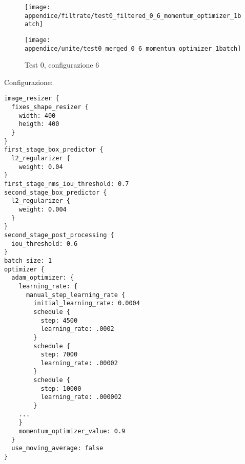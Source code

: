\newpage
\begin{figure}[H]  
    \begin{minipage}{.5\columnwidth}  
        \centering  
        \texttt{[image: appendice/filtrate/test0\_filtered\_0\_6\_momentum\_optimizer\_1batch]}  
    \end{minipage}%
    \begin{minipage}{0.5\columnwidth}  
        \centering  
        \texttt{[image: appendice/unite/test0\_merged\_0\_6\_momentum\_optimizer\_1batch]}  
    \end{minipage}  
    \caption{Test 0, configurazione 6}
\end{figure}%
Configurazione:
\begin{multicols}{2}
    \begin{lstlisting}
image_resizer {
  fixes_shape_resizer {
    width: 400
    heigth: 400
  }
}
first_stage_box_predictor {
  l2_regularizer {
    weight: 0.04
}
first_stage_nms_iou_threshold: 0.7
second_stage_box_predictor {
  l2_regularizer {
    weight: 0.004
  }
}
second_stage_post_processing {
  iou_threshold: 0.6
}
batch_size: 1
optimizer {
  adam_optimizer: {
    learning_rate: {
      manual_step_learning_rate {
        initial_learning_rate: 0.0004
        schedule {
          step: 4500
          learning_rate: .0002
        }
        schedule {
          step: 7000
          learning_rate: .00002
        }
        schedule {
          step: 10000
          learning_rate: .000002
        }
    ...
    }
    momentum_optimizer_value: 0.9
  }
  use_moving_average: false
}
    \end{lstlisting}
\end{multicols}
